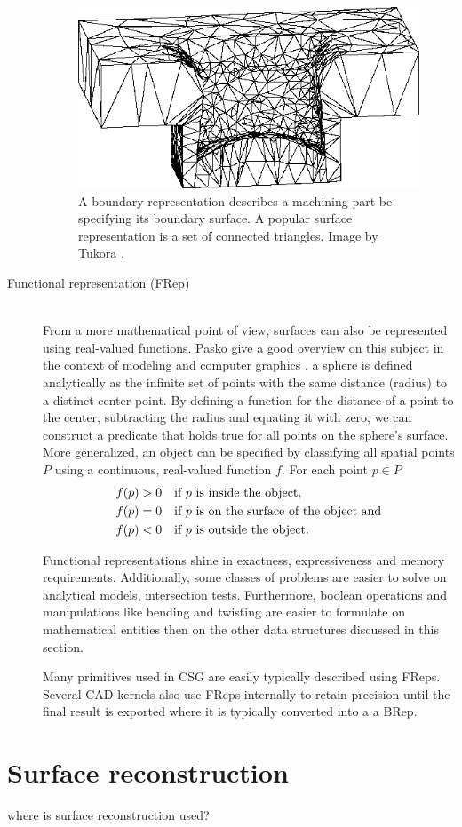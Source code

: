 \begin{description}
	\begin{figure}[h]
		\centering
		\includegraphics[width=\textwidth]{images/brep}
		\caption{
			A boundary representation describes a machining part be specifying its boundary surface. A popular surface representation is a set of connected triangles. 
			Image by Tukora \cite{virtual_machining_review}. 
		}
		\label{fig:brep}
	\end{figure}
	
	\item[Functional representation (FRep)] \hfill \\
	From a more mathematical point of view, surfaces can also be represented using real-valued functions.
	Pasko \etal give a good overview on this subject in the context of modeling and computer graphics \cite{frep}.
	\Eg a sphere is defined analytically as the infinite set of points with the same distance (radius) to a distinct center point.
	By defining a function for the distance of a point to the center, subtracting the radius and equating it with zero, we can construct a predicate that holds true for all points on the sphere's surface.
	More generalized, an object can be specified by classifying all spatial points $P$ using a continuous, real-valued function $f$. For each point $p \in P$
	\begin{align}
		f(p) &> 0 \quad \text{if $p$ is inside the object,}               \notag \\
		f(p) &= 0 \quad \text{if $p$ is on the surface of the object and} \notag \\
		f(p) &< 0 \quad \text{if $p$ is outside the object.}              \notag
	\end{align}
	
	Functional representations shine in exactness, expressiveness and memory requirements.
	Additionally, some classes of problems are easier to solve on analytical models, \eg intersection tests.
	Furthermore, boolean operations and manipulations like bending and twisting are easier to formulate on mathematical entities then on the other data structures discussed in this section.
	
	Many primitives used in CSG are easily typically described using FReps.
	Several CAD kernels also use FReps internally to retain precision until the final result is exported where it is typically converted into a \eg a BRep.
	
\end{description}


\section{Surface reconstruction}
\label{sec:surface_reconstruction}

where is surface reconstruction used?
